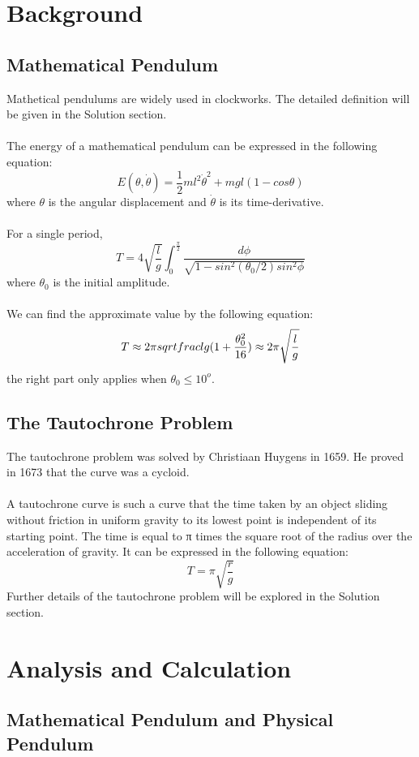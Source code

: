 \documentclass[12pt,a4paper]{article}
\begin{document}
\section{Background}
\subsection{Mathematical Pendulum}
Mathetical pendulums are widely used in clockworks. The detailed definition will be given in the Solution section.\\
~\\
The energy of a mathematical pendulum can be expressed in the following equation:
$$E(\theta,\dot{\theta})=\frac{1}{2}ml^2 \dot{\theta}^2+ mgl(1-cos \theta)$$
where $\theta$ is the angular displacement and $\dot{\theta} $ is its time-derivative.\\
~\\
For a single period,
$$T=4\sqrt{\frac{l}{g}} \int_{0}^{\frac{\pi}{2}}\frac{d\phi}{\sqrt{1-sin^2(\theta_0/2)sin^2\phi}}$$
where $\theta_0$ is the initial amplitude.\\
~\\
We can find the approximate value by the following equation:
$$T \approx 2\pi \\sqrt{frac{l}{g}}(1+\frac{\theta_0^2}{16})\approx 2\pi \sqrt{\frac{l}{g}}$$
the right part only applies when $\theta_0 \leqslant 10^o$.\\
\subsection{The Tautochrone Problem}
The tautochrone problem was solved by Christiaan Huygens in 1659. He proved in 1673 that the curve was a cycloid.\\
~\\
A tautochrone curve is such a curve that the time taken by an object sliding without friction in uniform gravity to its lowest point is independent of its starting point. The time is equal to π times the square root of the radius over the acceleration of gravity. It can be expressed in the following equation:
$$T=\pi \sqrt{\frac{r}{g}}$$
Further details of the tautochrone problem will be explored in the Solution section.\\
\section{Analysis and Calculation}
\subsection{Mathematical Pendulum and Physical Pendulum}
\end{document}
